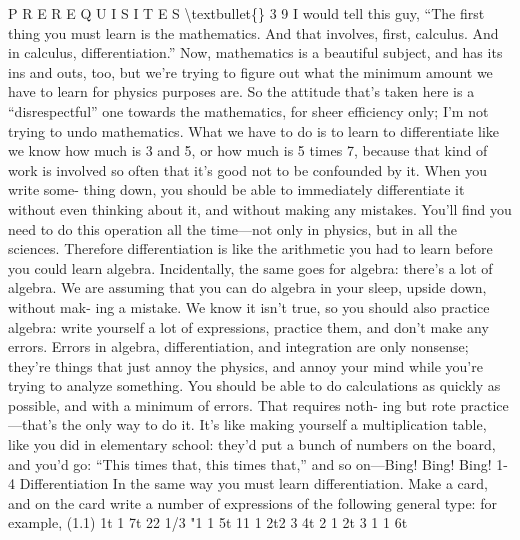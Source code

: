 \documentclass[10pt,oneside]{article}
\begin{document}
P R E R E Q U I S I T E S \textbackslash{}textbullet\{\} 3 9 I would tell this guy, “The first thing you must learn is the mathematics. And that involves, first, calculus. And in calculus, differentiation.” Now, mathematics is a beautiful subject, and has its ins and outs, too, but we’re trying to figure out what the minimum amount we have to learn for physics purposes are. So the attitude that’s taken here is a “disrespectful” one towards the mathematics, for sheer efficiency only; I’m not trying to undo mathematics. What we have to do is to learn to differentiate like we know how much is 3 and 5, or how much is 5 times 7, because that kind of work is involved so often that it’s good not to be confounded by it. When you write some- thing down, you should be able to immediately differentiate it without even thinking about it, and without making any mistakes. You’ll find you need to do this operation all the time---not only in physics, but in all the sciences. Therefore differentiation is like the arithmetic you had to learn before you could learn algebra. Incidentally, the same goes for algebra: there’s a lot of algebra. We are assuming that you can do algebra in your sleep, upside down, without mak- ing a mistake. We know it isn’t true, so you should also practice algebra: write yourself a lot of expressions, practice them, and don’t make any errors. Errors in algebra, differentiation, and integration are only nonsense; they’re things that just annoy the physics, and annoy your mind while you’re trying to analyze something. You should be able to do calculations as quickly as possible, and with a minimum of errors. That requires noth- ing but rote practice---that’s the only way to do it. It’s like making yourself a multiplication table, like you did in elementary school: they’d put a bunch of numbers on the board, and you’d go: “This times that, this times that,” and so on---Bing! Bing! Bing! 1-4 Differentiation In the same way you must learn differentiation. Make a card, and on the card write a number of expressions of the following general type: for example, (1.1) 1t 1 7t 22 1/3 "1 1 5t 11 1 2t2 3 4t 2 1 2t 3 1 1 6t\par
\end{document}
